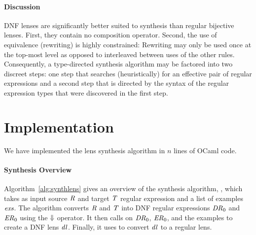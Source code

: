 \documentclass[numbers,10pt,preprint\ifanon ,nocopyrightspace\fi]{sigplanconf}
\begin{document}
\paragraph*{Discussion} 
DNF lenses are significantly better suited to synthesis than regular
bijective lenses.  First, they contain no composition operator.
Second, the use of equivalence (rewriting) is highly constrained:  Rewriting
may only be used once at the top-most level as opposed to interleaved
between uses of the other rules.  Consequently, a type-directed synthesis
algorithm may be factored into two discreet steps: one step that
searches (heuristically) for an effective pair of regular expressions
and a second step that is directed by the syntax of the regular expression
types that were discovered in the first step.

\section{Implementation}
\label{implementation}
We have implemented the lens synthesis algorithm in $n$ lines
of OCaml code. 

\paragraph*{Synthesis Overview}
Algorithm~\ref{alg:synthlens} gives an overview of the synthesis
algorithm, \SynthLens{}, which takes as input source $\mathit{R}$ and
target $\mathit{T}$ regular expression and a list of examples
$\mathit{exs}$.
The algorithm converts
$\mathit{R}$ and $\mathit{T}$ into DNF regular expressions
$\mathit{DR}_0$ and $\mathit{ER}_0$
using the $\Downarrow$ operator.
It then calls \SynthDNFLens{}
on $\mathit{DR}_0$, $\mathit{ER}_0$, and the examples
to create a DNF lens $\mathit{dl}$.  
Finally, it uses \ToLens{} to convert $\mathit{dl}$ to a regular lens.
\end{document}
